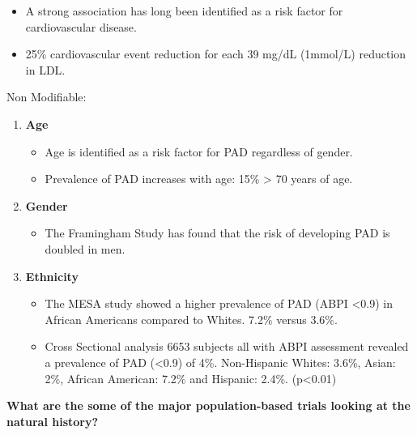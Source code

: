 \documentclass[
]{book}
\providecommand{\tightlist}{%
  \setlength{\itemsep}{0pt}\setlength{\parskip}{0pt}}
\begin{document}
\begin{enumerate}
  \begin{itemize}
  \item
    A strong association has long been identified as a risk factor
    for cardiovascular disease.
  \item
    25\% cardiovascular event reduction for each 39 mg/dL (1mmol/L)
    reduction in LDL.
    \citep{heartprotectionstudycollaborativegroupRandomizedTrialEffects2007}
  \end{itemize}
\end{enumerate}

Non Modifiable:

\begin{enumerate}
\def\labelenumi{\arabic{enumi}.}
\item
  \textbf{Age}

  \begin{itemize}
  \item
    Age is identified as a risk factor for PAD regardless of gender.
  \item
    Prevalence of PAD increases with age: 15\% \textgreater{} 70 years of age.
  \end{itemize}
\item
  \textbf{Gender}

  \begin{itemize}
  \tightlist
  \item
    The Framingham Study has found that the risk of developing PAD
    is doubled in men.
  \end{itemize}
\item
  \textbf{Ethnicity}

  \begin{itemize}
  \item
    The MESA study showed a higher prevalence of PAD (ABPI \textless0.9) in
    African Americans compared to Whites. 7.2\% versus 3.6\%.
    \citep{bildMultiEthnicStudyAtherosclerosis2002}
  \item
    Cross Sectional analysis 6653 subjects all with ABPI assessment
    revealed a prevalence of PAD (\textless0.9) of 4\%. Non-Hispanic Whites:
    3.6\%, Asian: 2\%, African American: 7.2\% and Hispanic: 2.4\%.
    (p\textless0.01) \citep{allisonEffectNovelCardiovascular2006}
  \end{itemize}
\end{enumerate}

\textbf{What are the some of the major population-based trials looking at the
natural history?}
\end{document}
